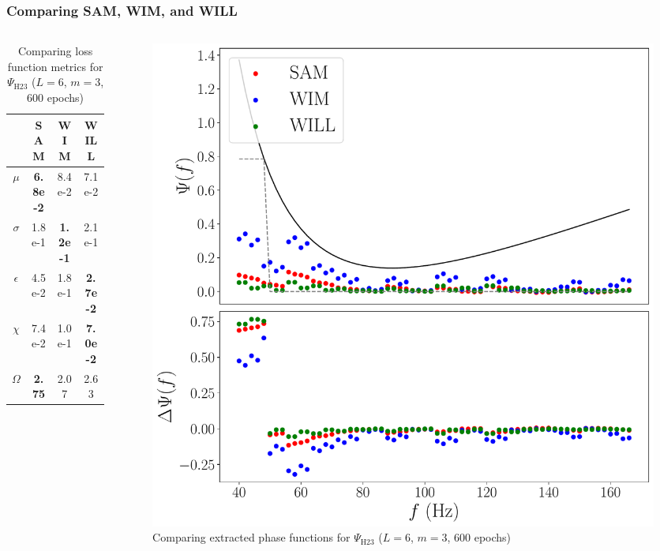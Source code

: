 \documentclass{beamer}
\begin{document}
\begin{frame}
\frametitle{Comparing SAM, WIM, and WILL}
\begin{columns}
\begin{column}{0.5\textwidth}
\begin{table}
\begin{tabular}{c || c| c| c }
& SAM & WIM & WILL \\ \hline \hline 
$\mu$ &  \textbf{6.8e-2} & 8.4e-2 & 7.1e-2 \\
$\sigma$ &  1.8e-1 & \textbf{1.2e-1} & 2.1e-1\\
$\epsilon$  &  4.5e-2 & 1.8e-1 & \textbf{2.7e-2}\\
$\chi$ &  7.4e-2 & 1.0e-1 & \textbf{7.0e-2} \\ \hline 
$\Omega$ &  \textbf{2.75} & 2.07 & 2.63
\end{tabular}
\caption{Comparing loss function metrics for $\Psi_\text{H23}$ ($L=6$, $m=3$, 600 epochs)}
\end{table}
\end{column}
\begin{column}{0.5\textwidth}
\begin{figure}
\centering 
\includegraphics[width=\textwidth]{im/SAM_WIM_WILL_H}
\caption{Comparing extracted phase functions for $\Psi_\text{H23}$ ($L=6$, $m=3$, 600 epochs)}
\end{figure}
\end{column}
\end{columns}
\end{frame}
\end{document}
